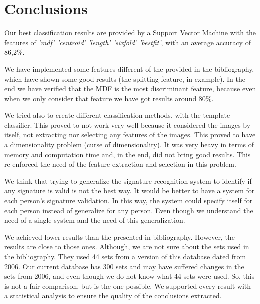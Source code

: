 \documentclass[12pt,a4paper]{report}
\begin{document}
		\pagebreak
		
		\chapter{Conclusions}
		\label{sec:conclusions}
		
		Our best classification results are provided by a Support Vector Machine with the features of \emph{'mdf' 'centroid' 'length' 'sixfold' 'bestfit'}, with an average accuracy of 86,2\%.
		
		
	  We have implemented some features different of the provided in the bibliography, which have shown some good results (the splitting feature, in example). In the end we have verified that the MDF is the most discriminant feature, because even when we only consider that feature we have got results around 80\%.
		
		
		We tried also to create different classification methods, with the template classifier. This proved to not work very well because it considered the images by itself, not extracting nor selecting any features of the images. This proved to have a dimensionality problem (curse of dimensionality). It was very heavy in terms of memory and computation time and, in the end, did not bring good results. This re-enforced the need of the feature extraction and selection in this problem.
		
		
		We think that trying to generalize the signature recognition system to identify if any signature is valid is not the best way. It would be better to have a system for each person's signature validation. In this way, the system could specify itself for each person instead of generalize for any person. Even though we understand the need of a single system and the need of this generalization.
		
		We achieved lower results than the presented in bibliography. However, the results are close to those ones. Although, we are not sure about the sets used in the bibliography. They used 44 sets from a version of this database dated from 2006. Our current database has 300 sets and may have suffered changes in the sets from 2006, and even though we do not know what 44 sets were used. So, this is not a fair comparison, but is the one possible. We supported every result with a statistical analysis to ensure the quality of the conclusions extracted.
		
		
		
		
	
\end{document}
